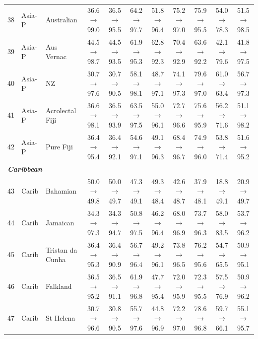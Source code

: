 \begin{table}[t]
{\begin{tabular}{rll c c c c c c c c}
38 & Asia-P & Australian & 36.6$\rightarrow$99.0 & 36.5$\rightarrow$95.5 & 64.2$\rightarrow$97.7 & 51.8$\rightarrow$96.4 & 75.2$\rightarrow$97.0 & 75.9$\rightarrow$95.5 & 54.0$\rightarrow$78.3 & 51.5$\rightarrow$98.5 \\
39 & Asia-P & Aus Vernac & 44.5$\rightarrow$98.7 & 44.5$\rightarrow$93.5 & 61.9$\rightarrow$95.3 & 62.8$\rightarrow$92.3 & 70.4$\rightarrow$92.9 & 63.6$\rightarrow$92.2 & 42.1$\rightarrow$79.6 & 41.8$\rightarrow$97.5 \\
40 & Asia-P & NZ & 30.7$\rightarrow$97.6 & 30.7$\rightarrow$90.5 & 58.1$\rightarrow$98.1 & 48.7$\rightarrow$97.1 & 74.1$\rightarrow$97.3 & 79.6$\rightarrow$97.0 & 61.0$\rightarrow$63.4 & 56.7$\rightarrow$97.3 \\
41 & Asia-P & Acrolectal Fiji & 36.6$\rightarrow$98.1 & 36.5$\rightarrow$93.9 & 63.5$\rightarrow$97.5 & 55.0$\rightarrow$96.1 & 72.7$\rightarrow$96.6 & 75.6$\rightarrow$95.9 & 56.2$\rightarrow$71.6 & 51.1$\rightarrow$98.2 \\
42 & Asia-P & Pure Fiji & 36.4$\rightarrow$95.4 & 36.4$\rightarrow$92.1 & 54.6$\rightarrow$97.1 & 49.1$\rightarrow$96.3 & 68.4$\rightarrow$96.7 & 74.9$\rightarrow$96.0 & 53.8$\rightarrow$71.4 & 51.6$\rightarrow$95.2 \\
\midrule
\multicolumn{11}{l}{\textit{\textbf{Caribbean}}} \\
43 & Carib & Bahamian & 50.0$\rightarrow$49.8 & 50.0$\rightarrow$49.7 & 47.3$\rightarrow$49.1 & 49.3$\rightarrow$48.4 & 42.6$\rightarrow$48.7 & 37.9$\rightarrow$48.1 & 18.8$\rightarrow$49.1 & 20.9$\rightarrow$49.7 \\
44 & Carib & Jamaican & 34.3$\rightarrow$97.3 & 34.3$\rightarrow$94.7 & 50.8$\rightarrow$97.5 & 46.2$\rightarrow$96.4 & 68.0$\rightarrow$96.9 & 73.7$\rightarrow$96.3 & 58.0$\rightarrow$83.5 & 53.7$\rightarrow$96.2 \\
45 & Carib & Tristan da Cunha & 36.4$\rightarrow$95.3 & 36.4$\rightarrow$90.9 & 56.7$\rightarrow$96.4 & 49.2$\rightarrow$96.1 & 73.8$\rightarrow$96.5 & 76.2$\rightarrow$95.6 & 54.7$\rightarrow$65.5 & 50.9$\rightarrow$95.1 \\
46 & Carib & Falkland & 36.5$\rightarrow$95.2 & 36.5$\rightarrow$91.1 & 61.9$\rightarrow$96.8 & 47.7$\rightarrow$95.4 & 72.0$\rightarrow$95.9 & 72.3$\rightarrow$95.5 & 57.5$\rightarrow$76.9 & 50.9$\rightarrow$96.2 \\
47 & Carib & St Helena & 30.7$\rightarrow$96.6 & 30.8$\rightarrow$90.5 & 55.7$\rightarrow$97.6 & 44.8$\rightarrow$96.9 & 72.2$\rightarrow$97.0 & 78.6$\rightarrow$96.8 & 59.7$\rightarrow$66.1 & 55.1$\rightarrow$95.7 \\

\end{tabular}}
\end{table}
